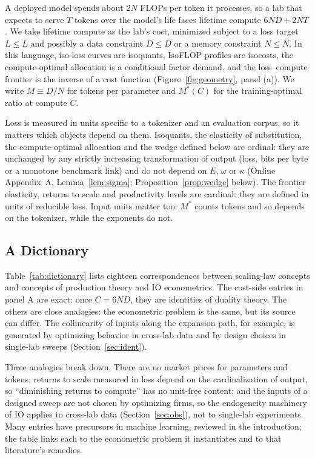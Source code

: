 A deployed model spends about $2N$ FLOPs per token it processes, so a lab that expects to serve $T$ tokens over the
model's life faces lifetime compute $6ND+2NT$ \citep{sardana2024beyond}. We take lifetime compute as the lab's
cost, minimized subject to a loss target $L\le\bar L$ and possibly a data constraint $D\le\bar D$ or a memory
constraint $N\le\bar N$. In this language, iso-loss curves are isoquants, IsoFLOP profiles are isocosts, the
compute-optimal allocation is a conditional factor demand, and the loss--compute frontier is the inverse of a cost
function (Figure~\ref{fig:geometry}, panel (a)). We write $M\equiv D/N$ for tokens per parameter and $M^*(C)$ for the
training-optimal ratio at compute $C$.

Loss is measured in units specific to a tokenizer and an evaluation corpus, so it matters which objects depend on
them. Isoquants, the elasticity of substitution, the compute-optimal allocation and the wedge defined below are
ordinal: they are unchanged by any strictly increasing transformation of output (loss, bits per byte or a monotone
benchmark link) and do not depend on $E$, $\omega$ or $\kappa$ (Online Appendix~A, Lemma~\ref{lem:sigma};
Proposition~\ref{prop:wedge} below). The
frontier elasticity, returns to scale and productivity levels are cardinal: they are defined in units of reducible
loss. Input units matter too: $M^*$ counts tokens and so depends on the tokenizer, while the exponents do not.

\subsection{A Dictionary}\label{sec:framework:dict}

Table~\ref{tab:dictionary} lists eighteen correspondences between scaling-law concepts and concepts of production
theory and IO econometrics. The cost-side entries in panel A are exact: once $C=6ND$, they are identities of duality
theory. The others are close analogies: the econometric problem is the same, but its source can differ. The
collinearity of inputs along the expansion path, for example, is generated by optimizing behavior in cross-lab data
and by design choices in single-lab sweeps (Section~\ref{sec:ident}).

Three analogies break down. There are no market prices for parameters and tokens; returns to scale measured in loss
depend on the cardinalization of output, so ``diminishing returns to compute'' has no unit-free content; and the
inputs of a designed sweep are not chosen by optimizing firms, so the endogeneity machinery of IO applies to cross-lab
data (Section~\ref{sec:obs}), not to single-lab experiments. Many entries have precursors in machine learning,
reviewed in the introduction; the table links each to the econometric problem it instantiates and to that
literature's remedies.

